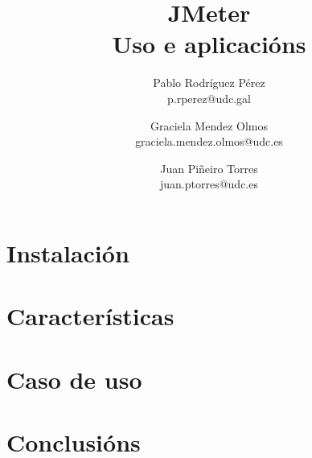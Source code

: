 \documentclass{article}
\title{JMeter \\ \small Uso e aplicacións}
\author{
	Pablo Rodríguez Pérez \\ p.rperez@udc.gal \and
	Graciela Mendez Olmos \\ graciela.mendez.olmos@udc.es \and
	Juan Piñeiro Torres   \\ juan.ptorres@udc.es
}
\begin{document}
\maketitle
\tableofcontents


\section{Instalación}

\section{Características}

\section{Caso de uso}

\section{Conclusións}
\end{document}

